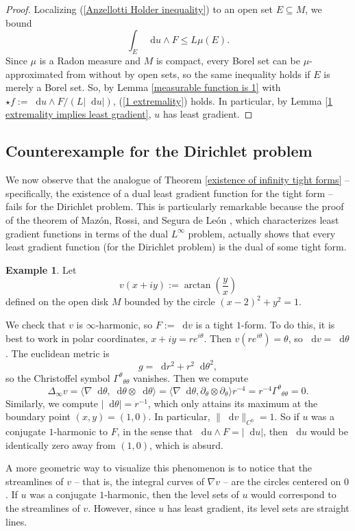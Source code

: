 \documentclass[reqno,11pt]{amsart}
\newcommand*\dif{\mathop{}\!\mathrm{d}}
\theoremstyle{definition}
\newtheorem{example}[theorem]{Example}
\numberwithin{equation}{section}
\begin{document}
\begin{proof}
Localizing (\ref{Anzellotti Holder inequality}) to an open set $E \subseteq M$, we bound
$$\int_E \dif u \wedge F \leq L \mu(E).$$
Since $\mu$ is a Radon measure and $M$ is compact, every Borel set can be $\mu$-approximated from without by open sets, so the same inequality holds if $E$ is merely a Borel set.
So, by Lemma \ref{measurable function is 1} with $\star f := \dif u \wedge F/(L|\dif u|)$, (\ref{1 extremality}) holds.
In particular, by Lemma \ref{1 extremality implies least gradient}, $u$ has least gradient.
\end{proof}

\subsection{Counterexample for the Dirichlet problem}
We now observe that the analogue of Theorem \ref{existence of infinity tight forms} -- specifically, the existence of a dual least gradient function for the tight form -- fails for the Dirichlet problem.
This is particularly remarkable because the proof of the theorem of Maz\'on, Rossi, and Segura de Le\'on \cite{Mazon14}, which characterizes least gradient functions in terms of the dual $L^\infty$ problem, actually shows that every least gradient function (for the Dirichlet problem) is the dual of some tight form.

\begin{example}\label{boundaries bad}
Let
$$v(x + iy) := \arctan\left(\frac{y}{x}\right)$$
defined on the open disk $M$ bounded by the circle $(x - 2)^2 + y^2 = 1$.

We check that $v$ is $\infty$-harmonic, so $F := \dif v$ is a tight $1$-form.
To do this, it is best to work in polar coordinates, $x + iy = re^{i\theta}$.
Then $v(re^{i\theta}) = \theta$, so $\dif v = \dif \theta$.
The euclidean metric is 
$$g = \dif r^2 + r^2 \dif \theta^2,$$
so the Christoffel symbol ${\Gamma^\theta}_{\theta \theta}$ vanishes.
Then we compute 
$$\Delta_\infty v = \langle \nabla \dif \theta, \dif \theta \otimes \dif \theta\rangle = \langle \nabla \dif \theta, \partial_\theta \otimes \partial_\theta \rangle r^{-4} = r^{-4} {\Gamma^\theta}_{\theta \theta} = 0.$$
Similarly, we compute $|\dif \theta| = r^{-1}$, which only attains its maximum at the boundary point $(x, y) = (1, 0)$.
In particular, $\|\dif v\|_{C^0} = 1$.
So if $u$ was a conjugate $1$-harmonic to $F$, in the sense that $\dif u \wedge F = |\dif u|$, then $\dif u$ would be identically zero away from $(1, 0)$, which is absurd.

A more geometric way to visualize this phenomenon is to notice that the streamlines of $v$ -- that is, the integral curves of $\nabla v$ -- are the circles centered on $0$.
If $u$ was a conjugate $1$-harmonic, then the level sets of $u$ would correspond to the streamlines of $v$.
However, since $u$ has least gradient, its level sets are straight lines.
\end{example}
\end{document}
